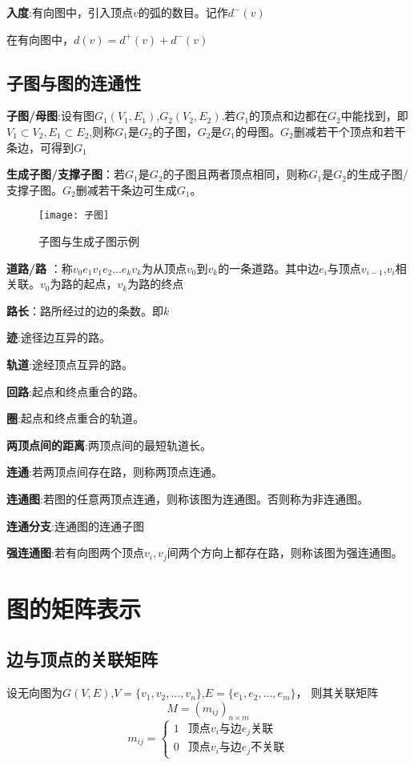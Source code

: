 \documentclass[withoutpreface]{cumcmthesis}
\begin{document}
\textbf{入度}:有向图中，引入顶点$v$的弧的数目。记作$d^-(v)$

在有向图中，$d(v)=d^+(v)+d^-(v)$

\subsection{子图与图的连通性}

\textbf{子图/母图}:设有图$G_1(V_1,E_1)$,$G_2(V_2,E_2)$.若$G_1$的顶点和边都在$G_2$中能找到，即$V_1\subset V_2,E_1\subset E_2$,则称$G_1$是$G_2$的子图，$G_2$是$G_1$的母图。$G_2$删减若干个顶点和若干条边，可得到$G_1$

\textbf{生成子图/支撑子图}：若$G_1$是$G_2$的子图且两者顶点相同，则称$G_1$是$G_2$的生成子图/支撑子图。$G_2$删减若干条边可生成$G_1$。

\begin{figure}[H]
  \centering
  \texttt{[image: 子图]}
  \caption{子图与生成子图示例}
\end{figure}

\textbf{道路/路} ：称$v_0e_1v_1e_2...e_kv_k$为从顶点$v_0$到$v_k$的一条道路。其中边$e_i$与顶点$v_{i-1}$,$v_i$相关联。$v_0$为路的起点，$v_k$为路的终点

\textbf{路长}：路所经过的边的条数。即$k$

\textbf{迹}:途径边互异的路。

\textbf{轨道}:途经顶点互异的路。

\textbf{回路}:起点和终点重合的路。

\textbf{圈}:起点和终点重合的轨道。

\textbf{两顶点间的距离}:两顶点间的最短轨道长。

\textbf{连通}:若两顶点间存在路，则称两顶点连通。

\textbf{连通图}:若图的任意两顶点连通，则称该图为连通图。否则称为非连通图。

\textbf{连通分支}:连通图的连通子图

\textbf{强连通图}:若有向图两个顶点$v_i,v_j$间两个方向上都存在路，则称该图为强连通图。

\section{图的矩阵表示}

\subsection{边与顶点的关联矩阵}

设无向图为$G(V,E)$,$V=\{v_1,v_2,...,v_n\}$,$E=\{e_1,e_2,...,e_m\}$，
则其关联矩阵
$$
  M=(m_{ij})_{n\times m}
$$
$$
  m_{ij}=
  \begin{cases} 1 & \mbox{顶点}v_i\mbox{与边}e_j\mbox{关联}  \\
              0 & \mbox{顶点}v_i\mbox{与边}e_j\mbox{不关联}
  \end{cases}
$$
\end{document}
